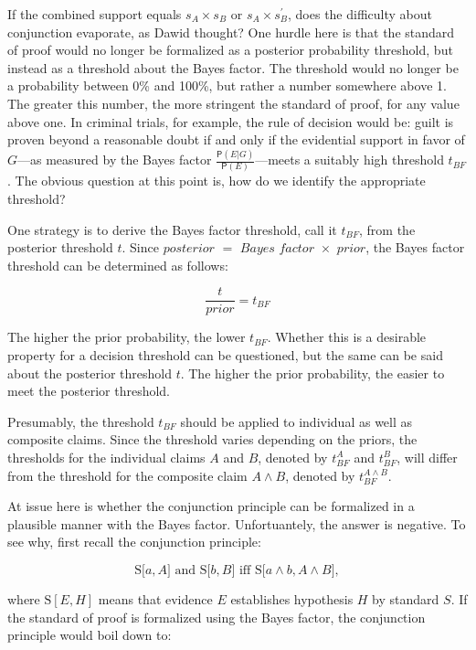 \documentclass[10pt,dvipsnames,enabledeprecatedfontcommands]{scrartcl}
\newcommand{\pr}[1]{\mathsf{P}(#1)}
\begin{document}
If the combined support equals \(s_{A}\times s_{B}\) or
\(s_{A}\times s^{'}_{B}\), does the difficulty about conjunction
evaporate, as Dawid thought? One hurdle here is that the standard of
proof would no longer be formalized as a posterior probability
threshold, but instead as a threshold about the Bayes factor. The
threshold would no longer be a probability between 0\% and 100\%, but
rather a number somewhere above 1. The greater this number, the more
stringent the standard of proof, for any value above one. In criminal
trials, for example, the rule of decision would be: guilt is proven
beyond a reasonable doubt if and only if the evidential support in favor
of \(G\)---as measured by the Bayes factor
\(\frac{\pr{E | G}}{\pr{E}}\)---meets a suitably high threshold
\(t_{BF}\). The obvious question at this point is, how do we identify
the appropriate
threshold?

One strategy is to derive the Bayes factor threshold, call it
\(t_{BF}\), from the posterior threshold \(t\). Since
\(\textit{posterior }=\textit{ Bayes factor }\times \textit{ prior}\),
the Bayes factor threshold can be determined as follows:

\[\frac{t}{\textit{prior}}=t_{BF}\]

\noindent
The higher the prior probability, the lower \(t_{BF}\). Whether this is
a desirable property for a decision threshold can be questioned, but the
same can be said about the posterior threshold \(t\). The higher the
prior probability, the easier to meet the posterior threshold.

Presumably, the threshold \(t_{BF}\) should be applied to individual as
well as composite claims. Since the threshold varies depending on the
priors, the thresholds for the individual claims \(A\) and \(B\),
denoted by \(t_{BF}^A\) and \(t_{BF}^B\), will differ from the threshold
for the composite claim \(A \wedge B\), denoted by
\(t_{BF}^{A\wedge B}\).

At issue here is whether the conjunction principle can be formalized in
a plausible manner with the Bayes factor. Unfortuantely, the answer is
negative. To see why, first recall the conjunction principle:

\[\text{S[$a, A$] and S[$b, B$] iff S[$a \wedge b, A\wedge B$]},\]

\noindent
where \(\text{S}[E, H]\) means that evidence \(E\) establishes
hypothesis \(H\) by standard \(S\). If the standard of proof is
formalized using the Bayes factor, the conjunction principle would boil
down to:
\end{document}
